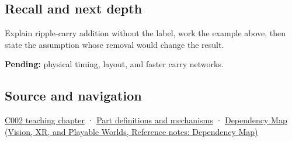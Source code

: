 \subsection{Recall and next depth}\label{appendix-17917d9fdbe3-recall-and-next-depth}

Explain ripple-carry addition without the label, work the example above, then state the assumption whose removal would change the result.

\textbf{Pending:} physical timing, layout, and faster carry networks.

\subsection{Source and navigation}\label{appendix-17917d9fdbe3-source-and-navigation}

\hyperref[01-foundations-i-ch001-arithmetic-becomes-a-policy]{C002 teaching chapter} · \hyperref[appendix-fd090d982a15]{Part definitions and mechanisms} · \href{../07-Vision-XR-and-Playable-Worlds/main.pdf\#nameddest=appendix-4ad47bdd269a}{Dependency Map (Vision, XR, and Playable Worlds, Reference notes: Dependency Map)}
